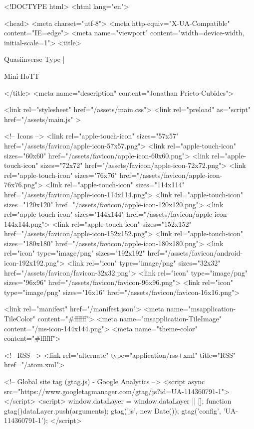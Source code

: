 <!DOCTYPE html>
<html lang="en">

<head>
  <meta charset="utf-8">
  <meta http-equiv="X-UA-Compatible" content="IE=edge">
  <meta name="viewport" content="width=device-width, initial-scale=1">
  <title>
    
      
        Quasiinverse Type |
      
        Mini-HoTT
    
  </title>
  <meta name="description" content="Jonathan Prieto-Cubides">

  <link rel="stylesheet" href="/assets/main.css">
  <link rel="preload" as="script" href="/assets/main.js" >

  <!-- Icons -->
  <link rel="apple-touch-icon" sizes="57x57" href="/assets/favicon/apple-icon-57x57.png">
  <link rel="apple-touch-icon" sizes="60x60" href="/assets/favicon/apple-icon-60x60.png">
  <link rel="apple-touch-icon" sizes="72x72" href="/assets/favicon/apple-icon-72x72.png">
  <link rel="apple-touch-icon" sizes="76x76" href="/assets/favicon/apple-icon-76x76.png">
  <link rel="apple-touch-icon" sizes="114x114" href="/assets/favicon/apple-icon-114x114.png">
  <link rel="apple-touch-icon" sizes="120x120" href="/assets/favicon/apple-icon-120x120.png">
  <link rel="apple-touch-icon" sizes="144x144" href="/assets/favicon/apple-icon-144x144.png">
  <link rel="apple-touch-icon" sizes="152x152" href="/assets/favicon/apple-icon-152x152.png">
  <link rel="apple-touch-icon" sizes="180x180" href="/assets/favicon/apple-icon-180x180.png">
  <link rel="icon" type="image/png" sizes="192x192"  href="/assets/favicon/android-icon-192x192.png">
  <link rel="icon" type="image/png" sizes="32x32" href="/assets/favicon/favicon-32x32.png">
  <link rel="icon" type="image/png" sizes="96x96" href="/assets/favicon/favicon-96x96.png">
  <link rel="icon" type="image/png" sizes="16x16" href="/assets/favicon/favicon-16x16.png">

  <link rel="manifest" href="/manifest.json">
  <meta name="msapplication-TileColor" content="#ffffff">
  <meta name="msapplication-TileImage" content="/ms-icon-144x144.png">
  <meta name="theme-color" content="#ffffff">

  <!-- RSS -->
  <link rel="alternate" type="application/rss+xml" title="RSS" href="/atom.xml">

  <!-- Global site tag (gtag.js) - Google Analytics -->
  <script async src="https://www.googletagmanager.com/gtag/js?id=UA-114360791-1"></script>
  <script>
    window.dataLayer = window.dataLayer || [];
    function gtag(){dataLayer.push(arguments);}
    gtag('js', new Date());
    gtag('config', 'UA-114360791-1');
  </script>


